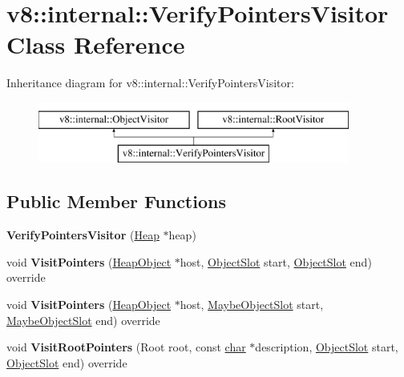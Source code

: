 \hypertarget{classv8_1_1internal_1_1VerifyPointersVisitor}{}\section{v8\+:\+:internal\+:\+:Verify\+Pointers\+Visitor Class Reference}
\label{classv8_1_1internal_1_1VerifyPointersVisitor}
Inheritance diagram for v8\+:\+:internal\+:\+:Verify\+Pointers\+Visitor\+:\begin{figure}[H]
\begin{center}
\leavevmode
\includegraphics[height=2.000000cm]{classv8_1_1internal_1_1VerifyPointersVisitor}
\end{center}
\end{figure}
\subsection*{Public Member Functions}
\begin{DoxyCompactItemize}
\item 
\mbox{\label{classv8_1_1internal_1_1VerifyPointersVisitor_a5293c0c820eca00a7c7b0a6a95f9b654}} 
{\bfseries Verify\+Pointers\+Visitor} (\mbox{\hyperlink{classv8_1_1internal_1_1Heap}{Heap}} $\ast$heap)
\item 
\mbox{\label{classv8_1_1internal_1_1VerifyPointersVisitor_aacf719c90ca4ded43a0a2d2a3d973280}} 
void {\bfseries Visit\+Pointers} (\mbox{\hyperlink{classv8_1_1internal_1_1HeapObject}{Heap\+Object}} $\ast$host, \mbox{\hyperlink{classv8_1_1internal_1_1ObjectSlot}{Object\+Slot}} start, \mbox{\hyperlink{classv8_1_1internal_1_1ObjectSlot}{Object\+Slot}} end) override
\item 
\mbox{\label{classv8_1_1internal_1_1VerifyPointersVisitor_a1582412b9011946614b632d5457234e3}} 
void {\bfseries Visit\+Pointers} (\mbox{\hyperlink{classv8_1_1internal_1_1HeapObject}{Heap\+Object}} $\ast$host, \mbox{\hyperlink{classv8_1_1internal_1_1MaybeObjectSlot}{Maybe\+Object\+Slot}} start, \mbox{\hyperlink{classv8_1_1internal_1_1MaybeObjectSlot}{Maybe\+Object\+Slot}} end) override
\item 
\mbox{\label{classv8_1_1internal_1_1VerifyPointersVisitor_acb875e45dfeb48e5cb5de7247a51e093}} 
void {\bfseries Visit\+Root\+Pointers} (Root root, const \mbox{\hyperlink{classchar}{char}} $\ast$description, \mbox{\hyperlink{classv8_1_1internal_1_1ObjectSlot}{Object\+Slot}} start, \mbox{\hyperlink{classv8_1_1internal_1_1ObjectSlot}{Object\+Slot}} end) override
\end{DoxyCompactItemize}
